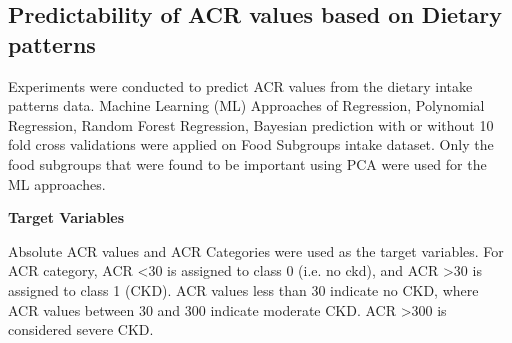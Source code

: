 \subsection{Predictability of ACR values based on Dietary patterns}
Experiments were conducted to predict ACR values from the dietary intake patterns data. Machine Learning (ML) Approaches of Regression, Polynomial Regression, Random Forest Regression, Bayesian prediction with or without 10 fold cross validations were applied on Food Subgroups intake dataset. Only the food subgroups that were found to be important using PCA were used for the ML approaches.

\noindent \textbf{Target Variables}

\noindent Absolute ACR values and ACR Categories were used as the target variables.  For ACR category, ACR  \textless   30 is assigned to class 0 (i.e. no ckd), and ACR  \textgreater  30 is assigned to class 1 (CKD). ACR values less than 30 indicate no CKD, where ACR values between 30 and 300 indicate moderate CKD. ACR \textgreater 300 is considered severe CKD.

